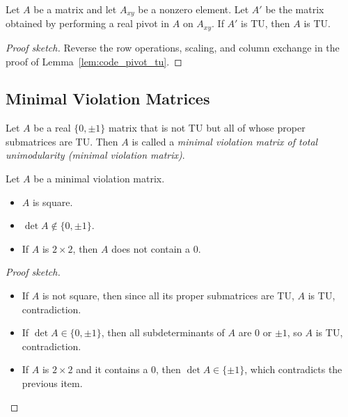 \begin{lemma}
  \label{lem:code_reverse_pivot_tu}
  Let $A$ be a matrix and let $A_{xy}$ be a nonzero element.
  Let $A'$ be the matrix obtained by performing a real pivot in $A$ on $A_{xy}$.
  If $A'$ is TU, then $A$ is TU.
\end{lemma}

\begin{proof}[Proof sketch]
  Reverse the row operations, scaling, and column exchange in the proof of Lemma~\ref{lem:code_pivot_tu}.
\end{proof}


\subsection{Minimal Violation Matrices}

\begin{definition}
  \label{def:code_mvm}
  Let $A$ be a real $\{0, \pm 1\}$ matrix that is not TU but all of whose proper submatrices are TU.
  Then $A$ is called a \emph{minimal violation matrix of total unimodularity (minimal violation matrix)}.
\end{definition}

\begin{lemma}
  \label{lem:code_mvm_props}
  Let $A$ be a minimal violation matrix.
  \begin{itemize}
    \item $A$ is square.
    \item $\det A \notin \{0, \pm 1\}$.
    \item If $A$ is $2 \times 2$, then $A$ does not contain a $0$.
  \end{itemize}
\end{lemma}

\begin{proof}[Proof sketch]
  \begin{itemize}
    \item If $A$ is not square, then since all its proper submatrices are TU, $A$ is TU, contradiction.
    \item If $\det A \in \{0, \pm 1\}$, then all subdeterminants of $A$ are $0$ or $\pm 1$, so $A$ is TU, contradiction.
    \item If $A$ is $2 \times 2$ and it contains a $0$, then $\det A \in \{\pm 1\}$, which contradicts the previous item.
  \end{itemize}
\end{proof}

